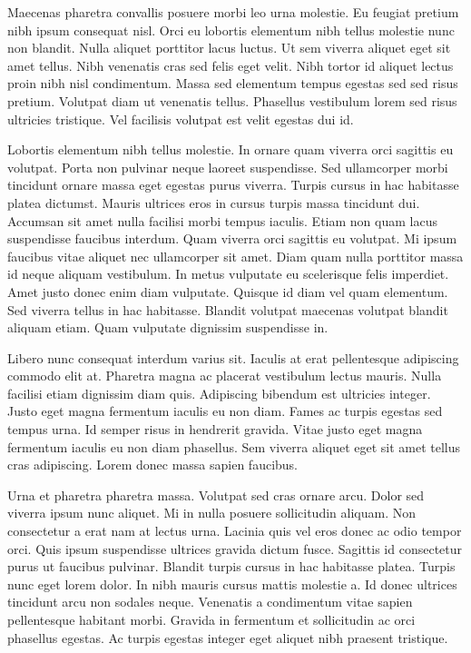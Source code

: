 \documentclass[11pt,a4paper]{article}
\begin{document}
Maecenas pharetra convallis posuere morbi leo urna molestie. Eu feugiat pretium nibh ipsum consequat nisl. Orci eu lobortis elementum nibh tellus molestie nunc non blandit. Nulla aliquet porttitor lacus luctus. Ut sem viverra aliquet eget sit amet tellus. Nibh venenatis cras sed felis eget velit. Nibh tortor id aliquet lectus proin nibh nisl condimentum. Massa sed elementum tempus egestas sed sed risus pretium. Volutpat diam ut venenatis tellus. Phasellus vestibulum lorem sed risus ultricies tristique. Vel facilisis volutpat est velit egestas dui id.

Lobortis elementum nibh tellus molestie. In ornare quam viverra orci sagittis eu volutpat. Porta non pulvinar neque laoreet suspendisse. Sed ullamcorper morbi tincidunt ornare massa eget egestas purus viverra. Turpis cursus in hac habitasse platea dictumst. Mauris ultrices eros in cursus turpis massa tincidunt dui. Accumsan sit amet nulla facilisi morbi tempus iaculis. Etiam non quam lacus suspendisse faucibus interdum. Quam viverra orci sagittis eu volutpat. Mi ipsum faucibus vitae aliquet nec ullamcorper sit amet. Diam quam nulla porttitor massa id neque aliquam vestibulum. In metus vulputate eu scelerisque felis imperdiet. Amet justo donec enim diam vulputate. Quisque id diam vel quam elementum. Sed viverra tellus in hac habitasse. Blandit volutpat maecenas volutpat blandit aliquam etiam. Quam vulputate dignissim suspendisse in.

Libero nunc consequat interdum varius sit. Iaculis at erat pellentesque adipiscing commodo elit at. Pharetra magna ac placerat vestibulum lectus mauris. Nulla facilisi etiam dignissim diam quis. Adipiscing bibendum est ultricies integer. Justo eget magna fermentum iaculis eu non diam. Fames ac turpis egestas sed tempus urna. Id semper risus in hendrerit gravida. Vitae justo eget magna fermentum iaculis eu non diam phasellus. Sem viverra aliquet eget sit amet tellus cras adipiscing. Lorem donec massa sapien faucibus.

Urna et pharetra pharetra massa. Volutpat sed cras ornare arcu. Dolor sed viverra ipsum nunc aliquet. Mi in nulla posuere sollicitudin aliquam. Non consectetur a erat nam at lectus urna. Lacinia quis vel eros donec ac odio tempor orci. Quis ipsum suspendisse ultrices gravida dictum fusce. Sagittis id consectetur purus ut faucibus pulvinar. Blandit turpis cursus in hac habitasse platea. Turpis nunc eget lorem dolor. In nibh mauris cursus mattis molestie a. Id donec ultrices tincidunt arcu non sodales neque. Venenatis a condimentum vitae sapien pellentesque habitant morbi. Gravida in fermentum et sollicitudin ac orci phasellus egestas. Ac turpis egestas integer eget aliquet nibh praesent tristique.
\end{document}
